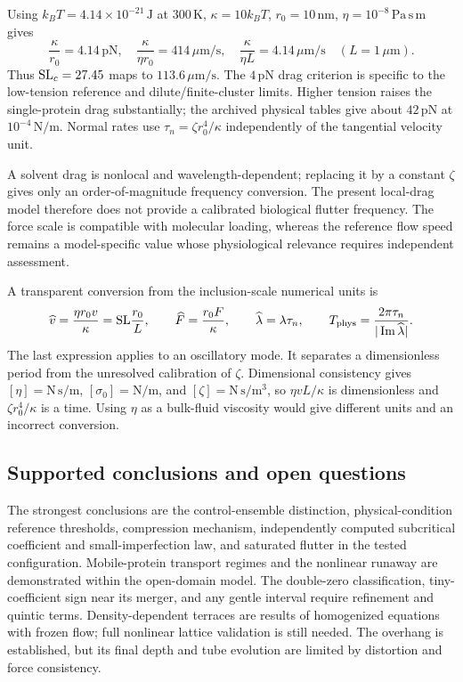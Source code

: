 Using $k_BT=4.14\times10^{-21}\,\mathrm J$ at $300\,\mathrm K$, $\kappa=10k_BT$, $r_0=10\,\mathrm{nm}$, $\eta=10^{-8}\,\mathrm{Pa\,s\,m}$ gives
\begin{equation}
\frac{\kappa}{r_0}=4.14\,\mathrm{pN},\quad
\frac{\kappa}{\eta r_0}=414\,\mu\mathrm{m/s},\quad
\frac{\kappa}{\eta L}=4.14\,\mu\mathrm{m/s}\quad(L=1\,\mu\mathrm m).
\end{equation}
Thus $\mathrm{SL}_c=27.45$ maps to $113.6\,\mu\mathrm{m/s}$. The $4\,\mathrm{pN}$ drag criterion is specific to the low-tension reference and dilute/finite-cluster limits. Higher tension raises the single-protein drag substantially; the archived physical tables give about $42\,\mathrm{pN}$ at $10^{-4}\,\mathrm{N/m}$. Normal rates use $\tau_n=\zeta r_0^4/\kappa$ independently of the tangential velocity unit.

A solvent drag is nonlocal and wavelength-dependent; replacing it by a constant $\zeta$ gives only an order-of-magnitude frequency conversion. The present local-drag model therefore does not provide a calibrated biological flutter frequency. The force scale is compatible with molecular loading, whereas the reference flow speed remains a model-specific value whose physiological relevance requires independent assessment.


A transparent conversion from the inclusion-scale numerical units is
\begin{equation}
\widehat v=\frac{\eta r_0v}{\kappa}=\mathrm{SL}\frac{r_0}{L},
\qquad \widehat F=\frac{r_0F}{\kappa},
\qquad \widehat\lambda=\lambda\tau_n,
\qquad T_{\rm phys}=\frac{2\pi\tau_n}{|\operatorname{Im}\widehat\lambda|}.
\label{eq:unit-conversion}
\end{equation}
The last expression applies to an oscillatory mode. It separates a dimensionless period from the unresolved calibration of $\zeta$. Dimensional consistency gives $[\eta]=\mathrm{N\,s/m}$, $[\sigma_0]=\mathrm{N/m}$, and $[\zeta]=\mathrm{N\,s/m^3}$, so $\eta vL/\kappa$ is dimensionless and $\zeta r_0^4/\kappa$ is a time. Using $\eta$ as a bulk-fluid viscosity would give different units and an incorrect conversion.

\subsection{Supported conclusions and open questions}


The strongest conclusions are the control-ensemble distinction, physical-condition reference thresholds, compression mechanism, independently computed subcritical coefficient and small-imperfection law, and saturated flutter in the tested configuration. Mobile-protein transport regimes and the nonlinear runaway are demonstrated within the open-domain model. The double-zero classification, tiny-coefficient sign near its merger, and any gentle interval require refinement and quintic terms. Density-dependent terraces are results of homogenized equations with frozen flow; full nonlinear lattice validation is still needed. The overhang is established, but its final depth and tube evolution are limited by distortion and force consistency.

